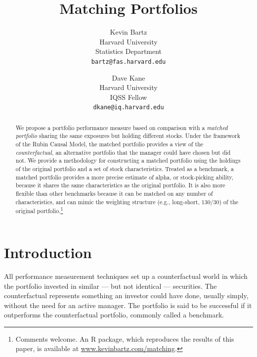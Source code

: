 \documentclass{article}\usepackage{graphicx, color}
\begin{document}
\title{Matching Portfolios}
\author{Kevin Bartz \\ Harvard University \\ Statistics Department \\
  \texttt{bartz@fas.harvard.edu}
  \and Dave Kane \\ Harvard University \\ IQSS Fellow \\
  \texttt{dkane@iq.harvard.edu}}

\maketitle


\begin{abstract}

We propose a portfolio performance measure based on comparison with a
\emph{matched portfolio} sharing the same exposures but holding
different stocks. Under the framework of the Rubin Causal Model, the
matched portfolio provides a view of the \emph{counterfactual}, an
alternative portfolio that the manager could have chosen but did
not. We provide a methodology for constructing a matched portfolio
using the holdings of the original portfolio and a set of stock
characteristics. Treated as a benchmark, a matched portfolio provides
a more precise estimate of alpha, or stock-picking ability, because it
shares the same characteristics as the original portfolio. It is also
more flexible than other benchmarks because it can be matched on any
number of characteristics, and can mimic the weighting structure
(e.g., long-short, 130/30) of the original
portfolio.\footnote{Comments welcome. An R package, which reproduces
  the results of this paper, is available at
  \url{www.kevinbartz.com/matching}.}

\end{abstract}




\section{Introduction}

All performance measurement techniques set up a counterfactual world
in which the portfolio invested in similar --- but not identical ---
securities. The counterfactual represents something an investor could
have done, usually simply, without the need for an active manager. The
portfolio is said to be successful if it outperforms the
counterfactual portfolio, commonly called a benchmark.
\end{document}

